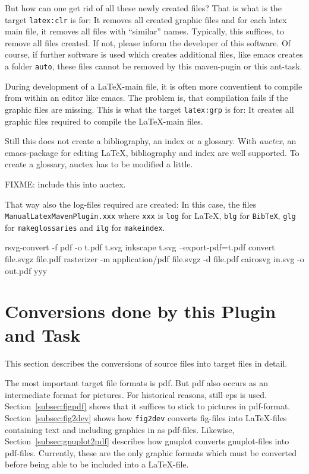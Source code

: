 \documentclass[12pt]{article}
\begin{document}
But how can one get rid of all these newly created files? 
That is what is the target {\tt latex:clr} is for: 
It removes all created graphic files 
and for each latex main file, it removes all files with ``similar'' names. 
Typically, this suffices, to remove all files created. 
If not, please inform the developer of this software. 
Of course, if further software is used which creates additional files, 
like emacs creates a folder {\tt auto}, 
these files cannot be removed by this maven-pugin or this ant-task. 

During development of a \LaTeX-main file, 
it is often more conventient to compile from within an editor like emacs. 
The problem is, that compilation fails if the graphic files are missing. 
This is what the target {\tt latex:grp} is for: 
It creates all graphic files required to compile the \LaTeX-main files. 

Still this does not create a bibliography, an index or a glossary. 
With {\em auctex}, an emacs-package for editing \LaTeX, 
bibliography and index are well supported. 
To create a glossary, auctex has to be modified a little. 

FIXME: include this into auctex. 

That way also the log-files required are created: 
In this case, the files {\tt ManualLatexMavenPlugin.xxx} 
where {\tt xxx} is {\tt log} for \LaTeX, {\tt blg} for {\tt BibTeX}, 
{\tt glg} for {\tt makeglossaries} and {\tt ilg} for {\tt makeindex}. 


rsvg-convert -f pdf -o t.pdf t.svg
inkscape t.svg --export-pdf=t.pdf
convert file.svgz file.pdf 
rasterizer -m application/pdf file.svgz -d file.pdf
cairosvg in.svg -o out.pdf
yyy

\section{Conversions done by this Plugin and Task}\label{sec:conversions}

This section describes the conversions of source files into target files 
in detail. 

The most important target file formats is \gls{pdf}. 
But pdf also occurs as an intermediate format for pictures. 
For historical reasons, still \gls{eps} is used. 
Section~\ref{subsec:figpdf} shows that it suffices to stick to pictures 
in pdf-format. 
Section~\ref{subsec:fig2dev} shows how {\tt fig2dev} converts fig-files 
into \LaTeX-files containing text and including graphics in as pdf-files. 
Likewise, Section~\ref{subsec:gnuplot2pdf} describes 
how gnuplot converts gnuplot-files into pdf-files. 
Currently, these are the only graphic formats which must be converted 
before being able to be included into a \LaTeX-file. 
\end{document}
